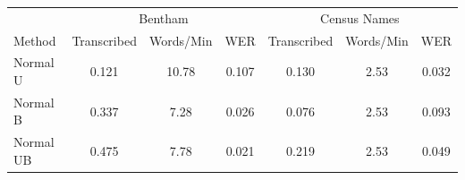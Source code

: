 \documentclass[ms,electronic,twosidetoc,letterpaper,chaptercenter,parttop,lof,lot]{byumsphd}
\begin{document}
\begin{table}
\centering
\begin{tabular}{| l | c c c | c c c |}
  \hline
   & \multicolumn{3}{c|}{Bentham} & \multicolumn{3}{c|}{Census Names}\\
  Method & Transcribed & Words/Min & WER & Transcribed & Words/Min & WER\\
  \hline  
  Normal U & 0.121 & 10.78 & 0.107 &  0.130 & 2.53 & 0.032 \\
  Normal B & 0.337 & 7.28 & 0.026 &  0.076 & 2.53 & 0.093 \\
  Normal UB & 0.475 & 7.78 & 0.021 &  0.219 & 2.53 & 0.049 \\

\end{tabular}
\end{table}
\end{document}
